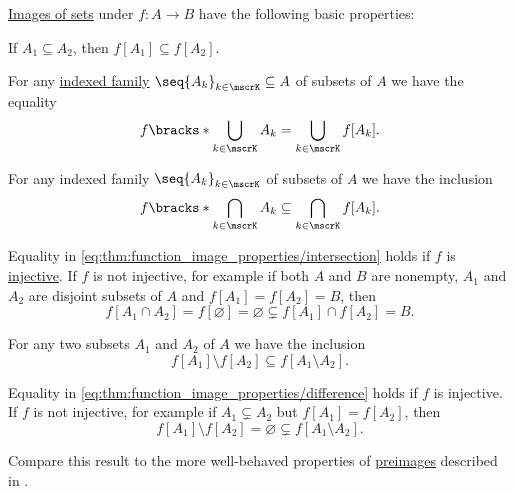 \begin{proposition}\label{thm:function_image_properties}
  \hyperref[def:multi_valued_function/set_value]{Images of sets} under \( f: A \to B \) have the following basic properties:
  \begin{thmenum}
     If \( A_1 \subseteq A_2 \), then \( f[A_1] \subseteq f[A_2] \).

     For any \hyperref[def:indexed_family]{indexed family} \( \seq{ A_k }_{k \in \mscrK} \subseteq A \) of subsets of \( A \) we have the equality
    \begin{equation}\label{eq:thm:function_image_properties/union}
      f\bracks*{ \bigcup_{k \in \mscrK} A_k } = \bigcup_{k \in \mscrK} f[A_k].
    \end{equation}

     For any indexed family \( \seq{ A_k }_{k \in \mscrK} \) of subsets of \( A \) we have the inclusion
    \begin{equation}\label{eq:thm:function_image_properties/intersection}
      f\bracks*{ \bigcap_{k \in \mscrK} A_k } \subseteq \bigcap_{k \in \mscrK} f[A_k].
    \end{equation}

    Equality in \eqref{eq:thm:function_image_properties/intersection} holds if \( f \) is \hyperref[def:function_invertibility/injective]{injective}. If \( f \) is not injective, for example if both \( A \) and \( B \) are nonempty, \( A_1 \) and \( A_2 \) are disjoint subsets of \( A \) and \( f[A_1] = f[A_2] = B \), then
    \begin{equation*}
      f[A_1 \cap A_2] = f[\varnothing] = \varnothing \subsetneq f[A_1] \cap f[A_2] = B.
    \end{equation*}

     For any two subsets \( A_1 \) and \( A_2 \) of \( A \) we have the inclusion
    \begin{equation}\label{eq:thm:function_image_properties/difference}
      f[A_1] \setminus f[A_2] \subseteq f[A_1 \setminus A_2].
    \end{equation}

    Equality in \eqref{eq:thm:function_image_properties/difference} holds if \( f \) is injective. If \( f \) is not injective, for example if \( A_1 \subsetneq A_2 \) but \( f[A_1] = f[A_2] \), then
    \begin{equation*}
      f[A_1] \setminus f[A_2] = \varnothing \subsetneq f[A_1 \setminus A_2].
    \end{equation*}
  \end{thmenum}

  Compare this result to the more well-behaved properties of \hyperref[thm:function_properties/preimage]{preimages} described in .
\end{proposition}
